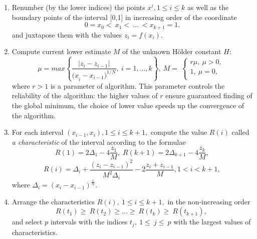 \documentclass{svproc}
\begin{document}
\begin{enumerate}
	
	\item  Renumber (by the lower indices) the points $x^i, 1\leq i\leq k$ as well as the boundary points of  the interval [0,1] in increasing order of the coordinate  
	\begin{equation} 
		\label{agp1_sort} 	0=x_0<\ x_1<\ ...\ <x_{k+1}=1. 	
	\end{equation} 
	and juxtapose them with the values $z_i=f(x_i)$. 
	
	\item  Compute current lower estimate $M$ of the unknown H{\"o}lder constant $H$:  
	\begin{equation} 
		\label{agp2_mu} 	\mu=max\left\{\frac{|z_i-z_{i-1}|}{{{(x}_i-x_{i-1})}^{1/N}},\ i=1,\ldots,k\right\},\ M=\  \left\{\begin{matrix}r\mu,\ \mu>0,\\1,\ \mu=0,\\\end{matrix}\right.\ 	
	\end{equation} 
	where $r>1$ is a parameter of algorithm. This parameter controls the reliability of the algorithm: the  higher values of $r$ ensure guaranteed finding of the global minimum, the choice of lower value speeds up the convergence of the algorithm. 
	
	\item  For each interval $(x_{i-1},x_i), 1\leq i\leq k+1,$ compute the value $R(i)$ called \textit{a  characteristic} of the interval according to the formulae 
	\begin{equation} 
		\label{agp3_R1} R(1)=2\Delta_1-4\dfrac{z_1}{M}, \; R(k+1)=2\Delta_{k+1}-4\dfrac{z_k}{M}, 
	\end{equation} 
	\begin{equation} 
		\label{agp3_Ri} R(i)=\Delta_i+\dfrac{(z_i-z_{i-1})^2}{M^2\Delta_i}-2\dfrac{z_i+z_{i-1}}{M},1<i<k+1, 
	\end{equation} 
	where \(\Delta_i=(x_i-x_{i-1})^\frac{1}{N}\).
	
	\item   Arrange the characteristics $R\left(i\right),\ 1\leq i \leq k+1,$ in the non-increasing order 
	\begin{equation} 
		\label{agp4_R_sort} 	R\left(t_1\right)\geq\ R\left(t_2\right)\geq...\geq\ R\left(t_k\right)\geq\ R(t_{k+1}),\  
	\end{equation} 	
	and select $p$ intervals with the indices $t_j,\ 1\le\ j\le\ p$ with the largest values of characteristics.
	

\end{enumerate}
\end{document}
